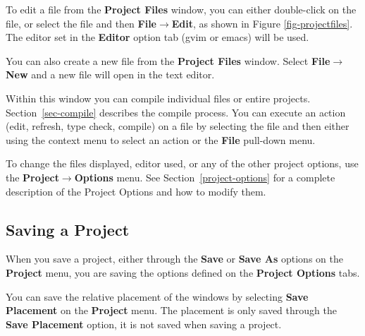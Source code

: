 \documentclass{article}
\begin{document}
To edit a file from the {\bf Project Files}
window, you can either
double-click on the file, or select the file and then  {\bf
File$\rightarrow$Edit}, as shown in Figure \ref{fig-projectfiles}.
The editor  set in the {\bf Editor} option tab
(gvim or emacs) will be used.

You can also create a new file from the {\bf Project Files} window.
Select {\bf File$\rightarrow$New} and a new file will open in the text editor.

Within this window you can  compile individual files or entire projects.  Section~\ref{sec-compile}
describes the compile process.  You can execute an action (edit,
refresh, type check,
compile) on a file by selecting the file and then
either using the context menu to select an action or the {\bf File}
pull-down menu.

To change the files displayed, editor used, or any of the other project options, use the {\bf
Project$\rightarrow$Options} menu.
See Section~\ref{project-options} for a complete description of the
Project Options and how to modify them.




\subsection{Saving a Project}

When you save a project, either through the {\bf Save} or {\bf Save
As} options on the {\bf Project} menu, you are saving the options
defined on the {\bf Project Options} tabs.


You can save the relative placement
of the windows by selecting {\bf Save Placement} on the {\bf Project}
menu.  The placement is only saved through the {\bf Save Placement}
option, it is not saved when saving a project.
\end{document}
